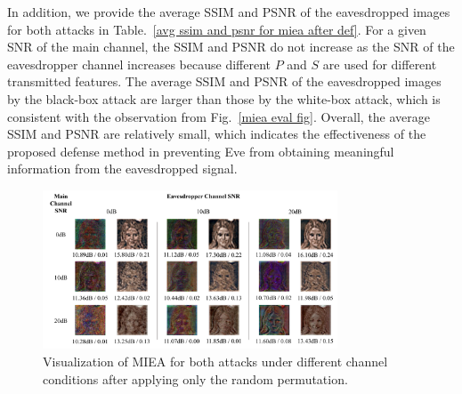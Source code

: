 \documentclass[conference]{IEEEtran}
\begin{document}
In addition, we provide the average SSIM and PSNR of the eavesdropped images for both attacks in Table.~\ref{avg ssim and psnr for miea after def}. For a given SNR of the main channel, the SSIM and PSNR do not increase as the SNR of the eavesdropper channel increases because different $P$ and $S$ are used for different transmitted features. The average SSIM and PSNR of the eavesdropped images by the black-box attack are larger than those by the white-box attack, which is consistent with the observation from Fig.~\ref{miea eval fig}. Overall, the average SSIM and PSNR are relatively small, which indicates the effectiveness of the proposed defense method in preventing Eve from obtaining meaningful information from the eavesdropped signal.





\begin{figure}[htbp]
\centering
   \includegraphics[width=3.45in]{figures/defense_p.pdf}
\caption{Visualization of MIEA for both attacks under different channel conditions after applying only the random permutation.}
\label{defense eval p only}
\end{figure}
\end{document}

